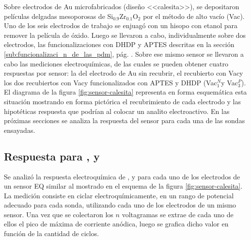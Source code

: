 {	Sobre electrodos de Au microfabricados (diseño <<calesita>>), se depositaron películas delgadas mesoporosas de Si$_{0.9}$Zr$_{0.1}$O$_2$ por el método de alto vacío (Vac\pdmZ). Uno de los seis electrodos de trabajo se enjuagó con un hisopo  con etanol para remover la película de óxido. Luego se llevaron a cabo, individualmente sobre dos electrodos, las funcionalizaciones con DHDP y APTES descritas en la sección \ref{sub:funcionalizaci_n_de_las_pdm}, pág. \pageref{sub:funcionalizaci_n_de_las_pdm}. Sobre ese mismo sensor se llevaron a cabo las mediciones electroquímicas, de las cuales se pueden obtener cuatro respuestas por sensor: la del electrodo de Au sin recubrir, el recubierto con Vac\pdmZ\space y los dos recubiertos con Vac\pdmZ\space y funcionalizados con APTES y DHDP (Vac\pdmZ$^N_1$\space y  Vac\pdmZ$^P_3$). El diagrama de la figura \ref{fig:sensor-calesita} representa en forma esquemática esta situación mostrando en forma pictórica el recubrimiento de cada electrodo y las hipotéticas respuesta que podrían al colocar un analito electroactivo. En las próximas secciones se analiza la respuesta del sensor para cada una de las sondas ensayadas.


	\subsection{Respuesta para \ru, \fe\space y \fc}	

		Se analizó la respuesta electroquímica de \aminorutenio, \ferroferri\space y \ferroceno\space para cada uno de los electrodos de un sensor EQ similar al mostrado en el esquema de la figura \ref{fig:sensor-calesita}. La medición consiste en ciclar electroquímicamente, en un rango de potencial adecuado para cada sonda, utilizando cada uno de los electrodos de un mismo sensor. Una vez que se colectaron los $n$ voltagramas se extrae de cada uno de ellos el pico de máxima de corriente anódica, luego se grafica dicho valor en función de la cantidad de ciclos. 



}
